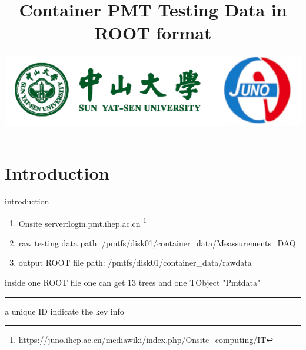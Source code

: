 \documentclass[11pt,compress,xcolor=x11names,UTF8]{beamer}
\title{Container PMT Testing Data in ROOT format}
\author[Rong. Zhao]{Email：zhaor25@mail2.sysu.edu.cn \and  } %
\institute[Sun Yat-Sen University]{School of Physics\and } %
\date[\today]{\includegraphics[width=.5\textwidth]{logo}}
\begin{document}
\maketitle


\section{Introduction}


%
\begin{frame}{ introduction }
	\begin{enumerate}
		\item Onsite server:login.pmt.ihep.ac.cn  \footnote{https://juno.ihep.ac.cn/mediawiki/index.php/Onsite\_computing/IT}
		\item raw testing data path: /pmtfs/disk01/container\_data/Meassurements\_DAQ
		\item output ROOT file path: /pmtfs/disk01/container\_data/rawdata 
	\end{enumerate}
\end{frame}
\begin{frame}{inside one ROOT file}
	one can get 13 trees and one TObject "Pmtdata"
\vspace{.5cm}
\hrule{\textwidth}
\vspace{.5cm}
a unique ID indicate the key info
\vspace{.5cm}
\end{frame}
\end{document}

